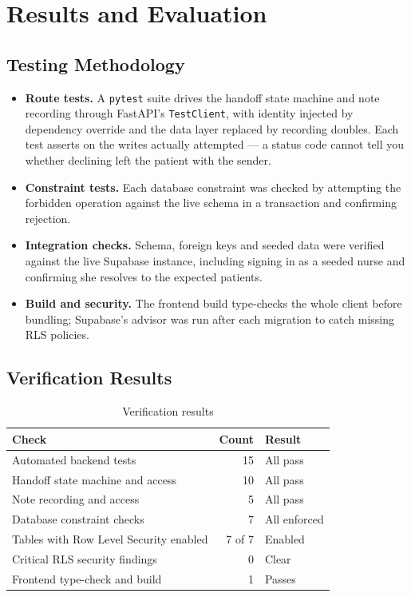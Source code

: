 \documentclass{tietreport}
\begin{document}

\chapter{Results and Evaluation}

\section{Testing Methodology}

\begin{itemize}
  \item \textbf{Route tests.} A \texttt{pytest} suite drives
    the handoff state machine and note recording through
    FastAPI's \texttt{TestClient}, with identity injected by
    dependency override and the data layer replaced by
    recording doubles. Each test asserts on the writes
    actually attempted --- a status code cannot tell you
    whether declining left the patient with the sender.
  \item \textbf{Constraint tests.} Each database constraint
    was checked by attempting the forbidden operation
    against the live schema in a transaction and confirming
    rejection.
  \item \textbf{Integration checks.} Schema, foreign keys
    and seeded data were verified against the live Supabase
    instance, including signing in as a seeded nurse and
    confirming she resolves to the expected patients.
  \item \textbf{Build and security.} The frontend build
    type-checks the whole client before bundling; Supabase's
    advisor was run after each migration to catch missing
    RLS policies.
\end{itemize}

\section{Verification Results}

\begin{table}[h]
\centering
{\small
\begin{tabular}{|p{7.2cm}|r|l|}
  \hline
  \textbf{Check} & \textbf{Count} & \textbf{Result} \\
  \hline
  Automated backend tests & 15 & All pass \\
  \hline
  \quad Handoff state machine and access & 10 & All pass \\
  \hline
  \quad Note recording and access & 5 & All pass \\
  \hline
  Database constraint checks & 7 & All enforced \\
  \hline
  Tables with Row Level Security enabled & 7 of 7 & Enabled \\
  \hline
  Critical RLS security findings & 0 & Clear \\
  \hline
  Frontend type-check and build & 1 & Passes \\
  \hline
\end{tabular}}
\caption{Verification results}
\label{tab:verification}
\end{table}
\end{document}
